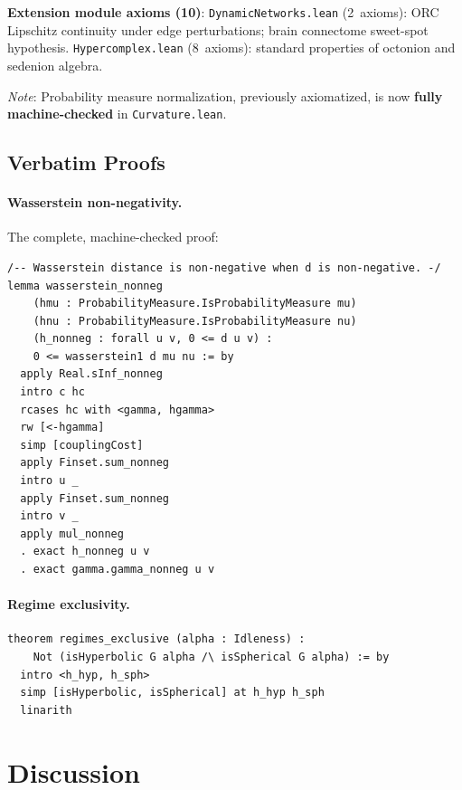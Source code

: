 \documentclass[12pt]{article}
\begin{document}
\textbf{Extension module axioms (10)}: \texttt{DynamicNetworks.lean} (2~axioms): ORC
Lipschitz continuity under edge perturbations; brain connectome sweet-spot hypothesis.
\texttt{Hypercomplex.lean} (8~axioms): standard properties of octonion and sedenion algebra.

\emph{Note}: Probability measure normalization, previously axiomatized, is now
\textbf{fully machine-checked} in \texttt{Curvature.lean}.

\subsection{Verbatim Proofs}

\paragraph{Wasserstein non-negativity.} The complete, machine-checked proof:

\begin{lstlisting}[language=Lean]
/-- Wasserstein distance is non-negative when d is non-negative. -/
lemma wasserstein_nonneg
    (hmu : ProbabilityMeasure.IsProbabilityMeasure mu)
    (hnu : ProbabilityMeasure.IsProbabilityMeasure nu)
    (h_nonneg : forall u v, 0 <= d u v) :
    0 <= wasserstein1 d mu nu := by
  apply Real.sInf_nonneg
  intro c hc
  rcases hc with <gamma, hgamma>
  rw [<-hgamma]
  simp [couplingCost]
  apply Finset.sum_nonneg
  intro u _
  apply Finset.sum_nonneg
  intro v _
  apply mul_nonneg
  . exact h_nonneg u v
  . exact gamma.gamma_nonneg u v
\end{lstlisting}

\paragraph{Regime exclusivity.}

\begin{lstlisting}[language=Lean]
theorem regimes_exclusive (alpha : Idleness) :
    Not (isHyperbolic G alpha /\ isSpherical G alpha) := by
  intro <h_hyp, h_sph>
  simp [isHyperbolic, isSpherical] at h_hyp h_sph
  linarith
\end{lstlisting}

\section{Discussion}
\label{sec:disc}
\end{document}
